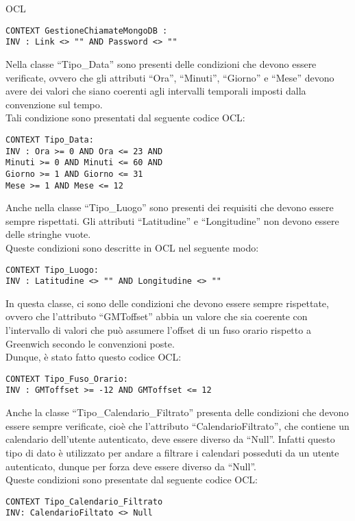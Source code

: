 \begin{listaPersonale}{OCL}
    \begin{lstlisting}
CONTEXT GestioneChiamateMongoDB :
INV : Link <> "" AND Password <> "" 
    \end{lstlisting}




    Nella classe “Tipo\_Data” sono presenti delle condizioni che devono essere verificate, ovvero che gli attributi “Ora”, “Minuti”, “Giorno” e “Mese” devono avere dei valori che siano coerenti agli intervalli temporali imposti dalla convenzione sul tempo.\\
    Tali condizione sono presentati dal seguente codice OCL:

    \begin{lstlisting}
CONTEXT Tipo_Data:
INV : Ora >= 0 AND Ora <= 23 AND
Minuti >= 0 AND Minuti <= 60 AND
Giorno >= 1 AND Giorno <= 31
Mese >= 1 AND Mese <= 12
    \end{lstlisting}




    Anche nella classe “Tipo\_Luogo” sono presenti dei requisiti che devono essere sempre rispettati. Gli attributi “Latitudine” e “Longitudine” non devono essere delle stringhe vuote.\\
    Queste condizioni sono descritte in OCL nel seguente modo:

    \begin{lstlisting}
CONTEXT Tipo_Luogo:
INV : Latitudine <> "" AND Longitudine <> "" 
    \end{lstlisting}




    In questa classe, ci sono delle condizioni che devono essere sempre rispettate, ovvero che l’attributo “GMToffset” abbia un valore che sia coerente con l’intervallo di valori che può assumere l’offset di un fuso orario rispetto a Greenwich secondo le convenzioni poste.\\
    Dunque, è stato fatto questo codice OCL:

    \begin{lstlisting}
CONTEXT Tipo_Fuso_Orario:
INV : GMToffset >= -12 AND GMToffset <= 12 
    \end{lstlisting}




    Anche la classe “Tipo\_Calendario\_Filtrato” presenta delle condizioni che devono essere sempre verificate, cioè che l’attributo “CalendarioFiltrato”, che contiene un calendario dell’utente autenticato, deve essere diverso da “Null”. Infatti questo tipo di dato è utilizzato per andare a filtrare i calendari posseduti da un utente autenticato, dunque per forza deve essere diverso da “Null”. \\
    Queste condizioni sono presentate dal seguente codice OCL:
    \begin{lstlisting}
CONTEXT Tipo_Calendario_Filtrato
INV: CalendarioFiltato <> Null
    \end{lstlisting}





\end{listaPersonale}
